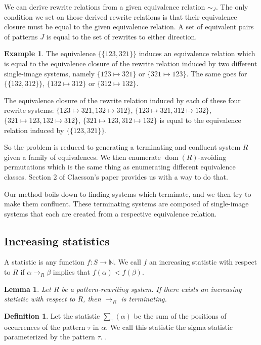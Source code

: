 \documentclass[openany, a4paper, 11pt, english]{article}
\newcommand{\patternrule}{ \mapsto \!}
\newtheorem{lemma}[theorem]{Lemma}
\theoremstyle{definition}
\newtheorem{definition}[theorem]{Definition}
\newtheorem{example}[theorem]{Example}
\newcommand{\Sym}{S}
\DeclareMathOperator{\dom}{dom}
\begin{document}
We can derive rewrite relations from a given equivalence relation $\sim_J$.
The only condition we set on those derived rewrite relations is that their
equivalence closure must be equal to the given equivalence relation.
A set of equivalent pairs of patterns $J$ is equal to the set of rewrites to
either direction. 
\begin{example}
    The equivalence $\{ \{123, 321 \} \}$ induces an equivalence relation which is
    equal to the equivalence closure of the rewrite relation induced by two
    different single-image systems, namely $\{123 \patternrule 321\}$ or $\{321
    \patternrule 123\}$. The same goes for $\{ \{ 132, 312 \} \}$, $\{132 \patternrule
    312\}$ or $\{312 \patternrule 132\}$.

    The equivalence closure of the rewrite relation induced by each of these
    four rewrite systems: $\{123 \patternrule 321, 132 \patternrule 312\}$, $\{123
    \patternrule 321, 312 \patternrule 132\}$, $\{321 \patternrule 123, 132
    \patternrule 312\}$, $\{321 \patternrule 123, 312 \patternrule 132\}$ is
    equal to the equivalence relation induced by $\{ \{ 123, 321 \} \}$.
\end{example}

So the problem is reduced to generating a terminating and confluent system $R$
given a family of equivalences. We then enumerate $\dom(R)$-avoiding
permutations which is the same thing as enumerating different equivalence
classes.  Section 2 of Claesson's paper provides us with a way to do that.
\cite{claesson:2021}

Our method boils down to finding systems which terminate, and we then try to
make them confluent. These terminating systems are composed of single-image
systems that each are created from a respective equivalence relation.

\subsection{Increasing statistics}
A statistic is any function $f : \Sym \to \mathbb{N}$. We call $f$ an increasing
statistic with respect to $R$ if $\alpha \to_R \beta$ implies that $f(\alpha) < f(\beta)$.

\begin{lemma}
    Let $R$ be a pattern-rewriting system. If there exists an increasing
    statistic with respect to $R$, then $\to_R$ is terminating.    
\end{lemma}

\begin{definition}
    Let the statistic $\sum_\tau(\alpha)$ be the sum of the positions of occurrences of
    the pattern $\tau$ in $\alpha$. We call this statistic the sigma statistic
    parameterized by the pattern $\tau$.
    \cite{claesson:2021}.
\end{definition}
\end{document}
